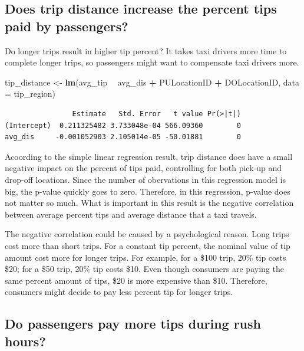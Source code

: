 \documentclass[12pt,twoside]{reedthesis}
\newenvironment{Shaded}{\begin{snugshade}}{\end{snugshade}}
\newcommand{\KeywordTok}[1]{\textcolor[rgb]{0.13,0.29,0.53}{\textbf{#1}}}
\newcommand{\DataTypeTok}[1]{\textcolor[rgb]{0.13,0.29,0.53}{#1}}
\newcommand{\StringTok}[1]{\textcolor[rgb]{0.31,0.60,0.02}{#1}}
\newcommand{\OperatorTok}[1]{\textcolor[rgb]{0.81,0.36,0.00}{\textbf{#1}}}
\newcommand{\NormalTok}[1]{#1}
\theoremstyle{definition}
\theoremstyle{definition}
\theoremstyle{definition}
\theoremstyle{remark}
\begin{document}
\subsection{Does trip distance increase the percent tips paid by
passengers?}\label{does-trip-distance-increase-the-percent-tips-paid-by-passengers}

Do longer trips result in higher tip percent? It takes taxi drivers more
time to complete longer trips, so passengers might want to compensate
taxi drivers more.
\begin{Shaded}
\begin{Highlighting}[]
\NormalTok{tip_distance <-}\StringTok{ }\KeywordTok{lm}\NormalTok{(avg_tip }\OperatorTok{~}\StringTok{ }\NormalTok{avg_dis }\OperatorTok{+}\StringTok{ }\NormalTok{PULocationID }\OperatorTok{+}\StringTok{ }\NormalTok{DOLocationID, }\DataTypeTok{data =}\NormalTok{ tip_region)}
\end{Highlighting}
\end{Shaded}
\begin{verbatim}
                Estimate   Std. Error   t value Pr(>|t|)
(Intercept)  0.211325482 3.733048e-04 566.09360        0
avg_dis     -0.001052903 2.105014e-05 -50.01881        0
\end{verbatim}
Acoording to the simple linear regression result, trip distance does
have a small negative impact on the percent of tips paid, controlling
for both pick-up and drop-off locations. Since the number of obervations
in this regression model is big, the p-value quickly goes to zero.
Therefore, in this regression, p-value does not matter so much. What is
important in this result is the negative correlation between average
percent tips and average distance that a taxi travels.

The negative correlation could be caused by a psychological reason. Long
trips cost more than short trips. For a constant tip percent, the
nominal value of tip amount cost more for longer trips. For example, for
a \$100 trip, 20\% tip costs \$20; for a \$50 trip, 20\% tip costs \$10.
Even though consumers are paying the same percent amount of tips, \$20
is more expensive than \$10. Therefore, consumers might decide to pay
less percent tip for longer trips.

\subsection{Do passengers pay more tips during rush
hours?}\label{do-passengers-pay-more-tips-during-rush-hours}
\end{document}
